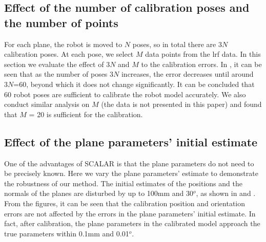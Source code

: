\subsection{Effect of the number of calibration poses and the number of points}
\label{sec:calib_poses}
For each plane, the robot is moved to $N$ poses, so in total there are $3N$ calibration poses. At each pose, we select $M$ data points from the \ac{lrf} data. In this section we evaluate the effect of $3N$ and $M$ to the calibration errors. In , it can be seen that as the number of poses $3N$ increases, the error decreases until around $3N$=60, beyond which it does not change significantly. It can be concluded that 60 robot poses are sufficient to calibrate the robot model accurately. We also conduct similar analysis on $M$ (the data is not presented in this paper) and found that $M$ = 20 is sufficient for the calibration.


\subsection{Effect of the plane parameters' initial estimate}
\label{sec:plane_params}
One of the advantages of SCALAR is that the plane parameters do not need to be precisely known. Here we vary the plane parameters' estimate to demonstrate the robustness of our method. The initial estimates of the positions and the normals of the planes are disturbed by up to 100mm and 30$^o$, as shown in  and . From the figures, it can be seen that the calibration position and orientation errors are not affected by the errors in the plane parameters' initial estimate. In fact, after calibration, the plane parameters in the calibrated model approach the true parameters within 0.1mm and 0.01$^o$.





